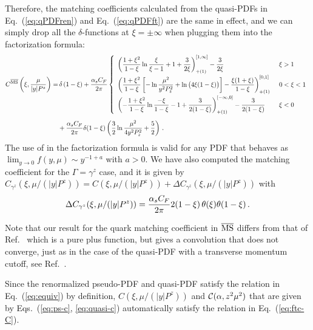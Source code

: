 \begin{widetext}
Therefore, the matching coefficients calculated from the quasi-PDFs in Eq.~(\ref{eq:qPDFren}) and Eq.~(\ref{eq:qPDFft}) are the same in effect, and we can simply drop all the $\delta$-functions at $\xi=\pm\infty$ when plugging them into the factorization formula:
\begin{align} \label{eq:quasi-matching}
C^{\overline{\rm MS}}\left(\xi, {\mu\over |y| P^z}\right)
= &\, \delta\left(1-\xi\right)+{\alpha_sC_F\over 2\pi}\left\{
\begin{array}{ll}
\displaystyle \left({1+\xi^2\over 1-\xi}\ln {\xi\over \xi-1} + 1 + {3\over 2\xi}\right)^{[1,\infty]}_{+(1)}- {3\over 2\xi}
&\, \xi>1
\\[10pt]
\displaystyle \left({1+\xi^2\over 1-\xi}\left[
- \ln{\mu^2\over y^2P_z^2} + \ln\big(4\xi(1-\xi)\big)\right] - {\xi(1+\xi)\over 1-\xi}\right)^{[0,1]}_{+(1)}
&\, 0<\xi<1
\\[10pt]
\displaystyle  \left(-{1+\xi^2\over 1-\xi}\ln {-\xi\over 1-\xi} - 1 + {3\over 2(1-\xi)}\right)^{[-\infty,0]}_{+(1)} - {3\over 2(1-\xi)}\quad
&\, \xi<0
\end{array}\right.\\[5pt]
& + {\alpha_sC_F\over 2\pi}\delta(1-\xi) \left( {3\over2}\ln{\mu^2\over 4y^2P_z^2} + {5\over2}\right)\,.\nonumber
\end{align}
The use of  in the factorization formula is valid for any PDF that behaves as $\lim_{y\to 0} f(y,\mu) \sim y^{-1+a}$ with $a>0$.
We have also computed the matching coefficient for the $\Gamma=\gamma^z$ case, and it is given by $C_{\gamma^z}(\xi, \mu/(|y| P^z)) = C(\xi, \mu/(|y| P^z)) + \Delta C_{\gamma^z}(\xi, \mu/(|y| P^z))$ with
\begin{align}
\Delta C_{\gamma^z}(\xi, \mu/(|y| P^z))  = {\alpha_s C_F\over 2\pi} 2(1-\xi)
  \,\theta(\xi)\theta(1-\xi) \,.
\end{align}

Note that our result for the quark matching coefficient in $\overline{\rm MS}$ differs from that of Ref.~\cite{Wang:2017qyg} which is a pure plus function, but gives a convolution that does not converge, just as in the case of the quasi-PDF with a transverse momentum cutoff, see Ref.~\cite{Stewart:2017tvs}.

Since the renormalized pseudo-PDF and quasi-PDF satisfy the relation in Eq.~(\ref{eq:equiv}) by definition, $C\left(\xi, \mu/(|y| P^z)\right)$ and ${\cal C}(\alpha,z^2\mu^2)$ that are given by Eqs.~(\ref{eq:ps-c}, \ref{eq:quasi-c}) automatically satisfy the relation in Eq.~(\ref{eq:ftc-C}).


\end{widetext}
